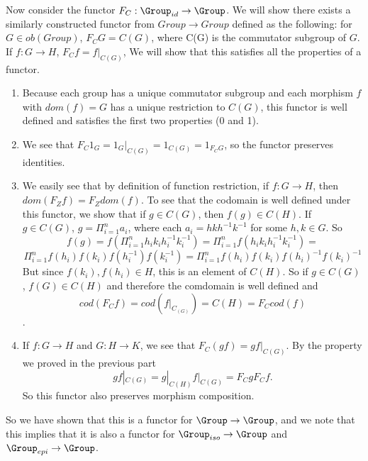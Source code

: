 \documentclass[main.tex]{subfiles}
\begin{document}
Now consider the functor $F_C:  \Group_{id} \rightarrow \Group$. We will show
there exists a similarly constructed functor from $Group \rightarrow Group$
defined as the following: for $G \in ob(Group)$, $F_CG = C(G)$, where C(G) is
the commutator subgroup of $G$. If $f : G \rightarrow H$, $F_Cf = f|_{C(G)}$, We
will show that this satisfies all the properties of a functor.
\begin{enumerate}
	\item Because each group has a unique commutator subgroup and each morphism
		$f$ with $dom(f) = G$ has a unique restriction to $C(G)$, this functor
		is well defined and satisfies the first two properties (0 and 1).

	\item We see that $F_{C} 1_{G} = 1_{G}|_{C(G)} = 1_{C(G)} = 1_{F_{C}G}$, so
		the functor preserves identities.

	\item We easily see that by definition of function restriction, if $f: G
		\rightarrow H$, then $dom(F_{Z}f) = F_{Z}dom(f)$. To see that the
		codomain is well defined under this functor, we show that if $g \in
		C(G)$, then $f(g) \in C(H)$. If $g \in C(G)$, $g = \Pi_{i = 1}^{n} a_i$,
		where each $a_i = hkh^{-1}k^{-1}$ for some $h,k \in G$. So $$f(g) =
		f(\Pi_{i = 1}^{n} h_ik_ih_i^{-1}k_i^{-1}) = \Pi_{i = 1}^{n}
		f(h_ik_ih_i^{-1}k_i^{-1}) =$$ $$  \Pi_{i = 1}^{n}
		f(h_i)f(k_i)f(h_i^{-1})f(k_i^{-1}) = \Pi_{i = 1}^{n}
		f(h_i)f(k_i)f(h_i)^{-1}f(k_i)^{-1}$$ But since $f(k_i), f(h_i) \in H$,
		this is an element of $C(H)$. So if $g \in C(G)$, $f(G) \in C(H)$ and
		therefore the comdomain is well defined and  \[cod(F_{C}f) =
		cod(f|_{C_(G)}) = C(H) = F_{C}cod(f)\].

	\item If $f:G \rightarrow H$ and $G: H \rightarrow K$, we see that $F_C(gf)
		= gf|_{C(G)}$. By the property we proved in the previous part
		\[gf|_{C(G)} = g|_{C(H)}f|_{C(G)} = F_CgF_Cf.\] So this functor also
		preserves morphism composition.
\end{enumerate}

So we have shown that this is a functor for $\Group \rightarrow \Group$, and we
note that this implies that it is also a functor for $\Group_{iso} \rightarrow
\Group$ and $\Group _{epi} \rightarrow \Group$.
\end{document}
